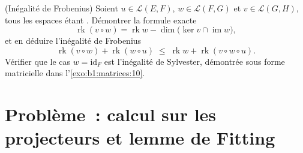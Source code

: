 \begin{exercise}[$\star\star\star$]\label{exo:b1:linmaps:12}
(Inégalité de Frobenius) Soient $u \in \mathcal{L}(E, F)$, $w \in
\mathcal{L}(F, G)$ et $v \in \mathcal{L}(G, H)$, tous les espaces étant
. Démontrer la formule exacte
\[
\operatorname{rk}(v \circ w) = \operatorname{rk} w -
\dim\bigl(\ker v \cap \operatorname{im} w\bigr),
\]
et en déduire l'inégalité de Frobenius
\[
\operatorname{rk}(v \circ w) + \operatorname{rk}(w \circ u)
\;\leq\; \operatorname{rk} w + \operatorname{rk}(v \circ w \circ
u) .
\]
Vérifier que le cas $w = \mathrm{id}_F$ est l'inégalité de Sylvester,
démontrée sous forme matricielle dans l'\cref{exo:b1:matrices:10}.
\end{exercise}

\section{Problème~: calcul sur les projecteurs et lemme de Fitting}

